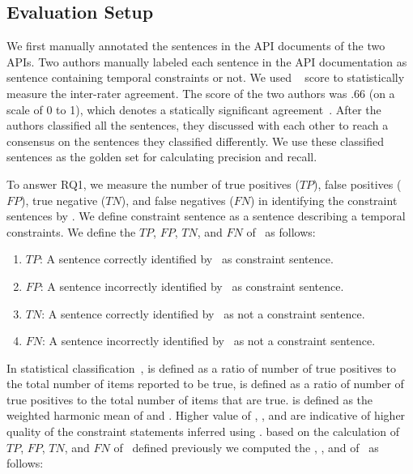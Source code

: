 \subsection{Evaluation Setup} 
We first manually annotated the sentences in the API documents of the two APIs.
Two authors manually labeled each sentence in the API documentation as sentence containing 
temporal constraints or not.
We used ~\cite{carletta1996assessing} score to statistically measure
the inter-rater agreement.
The  score of the two authors was .66 (on a scale of 0 to 1), 
which denotes a statically significant agreement~\cite{carletta1996assessing}. 
After the authors classified all the sentences, they 
discussed with each other to reach a consensus on the sentences they classified differently. 
We use these classified sentences as the golden set for calculating precision and recall.

To answer RQ1, we measure the number of true positives ($TP$), false positives ($FP$), true negative ($TN$), and false negatives ($FN$)
in identifying the constraint sentences by \tool.
We define constraint sentence as a sentence describing a temporal constraints.
We define the $TP$, $FP$, $TN$, and $FN$ of \tool\ as follows:

\begin{enumerate}
	\item $TP$: A sentence correctly identified by \tool\ as constraint sentence.
	\item $FP$: A sentence incorrectly identified by \tool\ as constraint sentence.
	\item $TN$: A sentence correctly identified by \tool\ as not a constraint sentence.
	\item $FN$: A sentence incorrectly identified by \tool\ as not a constraint sentence.
\end{enumerate}


In statistical classification~\cite{Olson08},  is defined as a ratio of
number of true positives to the total number of items reported to be true,
 is defined as a ratio of number of true positives to the total number
of items that are true.  is defined as the weighted harmonic mean of 
 and . Higher value of , , and 
are indicative of higher quality of the constraint statements inferred using 
\tool. based on the calculation of $TP$, $FP$, $TN$, and $FN$ of \tool\ defined
previously we computed the , , and  of \tool\ as follows:


